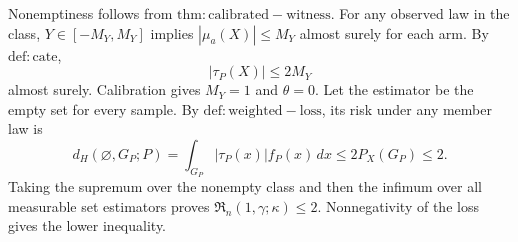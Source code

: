 Nonemptiness follows from \(\mathrm{thm:calibrated-witness}\). For any observed law in the class, \(Y\in[-M_Y,M_Y]\) implies \(|\mu_a(X)|\le M_Y\) almost surely for each arm. By \(\mathrm{def:cate}\),
\[
|\tau_P(X)|\le2M_Y
\]
almost surely. Calibration gives \(M_Y=1\) and \(\theta=0\). Let the estimator be the empty set for every sample. By \(\mathrm{def:weighted-loss}\), its risk under any member law is
\[
d_H(\varnothing,G_P;P)
=\int_{G_P}|\tau_P(x)|f_P(x)\,dx
\le2P_X(G_P)
\le2.
\]
Taking the supremum over the nonempty class and then the infimum over all measurable set estimators proves \(\mathfrak R_n(1,\gamma;\kappa)\le2\). Nonnegativity of the loss gives the lower inequality.